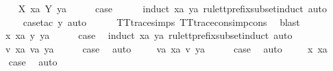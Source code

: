 \begin{isabellebody}
\isanewline
\ \ \isamarkupfalse%
\ {\isacharparenleft}{}\ X\ xa\ Y\ ya{\isacharparenright}\isanewline
\ \ \isamarkupfalse%
\ \isamarkupfalse%
\ {\isacharquery}case\isanewline
\ \ \ \ \isamarkupfalse%
\ {\isacharparenleft}induct\ xa\ ya\ rule{\isacharcolon}tt{\isacharunderscore}prefix{\isacharunderscore}subset{\isachardot}induct{\isacharcomma}\ auto{\isacharparenright}\isanewline
\ \ \ \ \isamarkupfalse%
\ {\isacharparenleft}case{\isacharunderscore}tac\ y{\isacharcomma}\ auto{\isacharparenright}\isanewline
\ \ \ \ \isamarkupfalse%
\ TT{}{\isacharunderscore}trace{\isachardot}simps{\isacharparenleft}{}{\isacharparenright}\ TT{}{\isacharunderscore}trace{\isacharunderscore}cons{\isacharunderscore}imp{\isacharunderscore}cons\ \isamarkupfalse%
\ blast\isanewline
{}\isamarkupfalse%
\isanewline
\ \ \isamarkupfalse%
\ {\isacharparenleft}{}\ x\ xa\ y\ ya{\isacharparenright}\isanewline
\ \ \isamarkupfalse%
\ \isamarkupfalse%
\ {\isacharquery}case\ \isamarkupfalse%
\ {\isacharparenleft}induct\ xa\ ya\ rule{\isacharcolon}tt{\isacharunderscore}prefix{\isacharunderscore}subset{\isachardot}induct{\isacharcomma}\ auto{\isacharparenright}\isanewline
{}\isamarkupfalse%
\isanewline
\ \ \isamarkupfalse%
\ {\isacharparenleft}{\isachardoublequoteopen}{}{\isacharunderscore}{}{\isachardoublequoteclose}\ v\ xa\ va\ ya{\isacharparenright}\isanewline
\ \ \isamarkupfalse%
\ \isamarkupfalse%
\ {\isacharquery}case\ \isamarkupfalse%
\ auto\isanewline
{}\isamarkupfalse%
\isanewline
\ \ \isamarkupfalse%
\ {\isacharparenleft}{\isachardoublequoteopen}{}{\isacharunderscore}{}{\isachardoublequoteclose}\ va\ xa\ v\ ya{\isacharparenright}\isanewline
\ \ \isamarkupfalse%
\ \isamarkupfalse%
\ {\isacharquery}case\ \isamarkupfalse%
\ auto\isanewline
{}\isamarkupfalse%
\isanewline
\ \ \isamarkupfalse%
\ {\isacharparenleft}{}\ x\ xa{\isacharparenright}\isanewline
\ \ \isamarkupfalse%
\ \isamarkupfalse%
\ {\isacharquery}case\ \isamarkupfalse%
\ auto\isanewline
{}\isamarkupfalse%
%
\endisatagproof
{\isafoldproof}%
%
\isadelimproof
\isanewline

\end{isabellebody}
